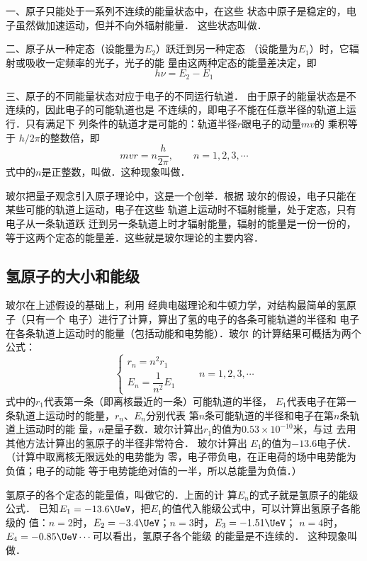 一、原子只能处于一系列不连续的能量状态中，在这些
状态中原子是稳定的，电子虽然做加速运动，但并不向外辐射能量．
这些状态叫做．

二、原子从一种定态（设能量为$E_2$）跃迁到另一种定态
（设能量为$E_1$）时，它辐射或吸收一定频率的光子，光子的能
量由这两种定态的能量差决定，即
\[h\nu=E_2-E_1\]

三、原子的不同能量状态对应于电子的不同运行轨道．
由于原子的能量状态是不连续的，因此电子的可能轨道也是
不连续的，即电子不能在任意半径的轨道上运行．只有满足下
列条件的轨道才是可能的：轨道半径$r$跟电子的动量$mv$的
乘积等于 $h/2\pi$的整数倍，即
\[mvr=n\frac{h}{2\pi},\qquad n=1,2,3,\cdots\]
式中的$n$是正整数，叫做．这种现象叫做．

玻尔把量子观念引入原子理论中，这是一个创举．根据
玻尔的假设，电子只能在某些可能的轨道上运动，电子在这些
轨道上运动时不辐射能量，处于定态，只有电子从一条轨道跃
迁到另一条轨道上时才辐射能量，辐射的能量是一份一份的，
等于这两个定态的能量差．这些就是玻尔理论的主要内容．

\subsection{氢原子的大小和能级}

玻尔在上述假设的基础上，利用
经典电磁理论和牛顿力学，对结构最简单的氢原子（只有一个
电子）进行了计算，算出了氢的电子的各条可能轨道的半径和
电子在各条轨道上运动时的能量（包括动能和电势能）．玻尔
的计算结果可概括为两个公式：
\[\begin{cases}
    r_n=n^2 r_1\\
    E_n=\dfrac{1}{n^2}E_1
\end{cases}\qquad n=1,2,3,\cdots\]
式中的$r_1$代表第一条（即离核最近的一条）可能轨道的半径，
$E_1$代表电子在第一条轨道上运动时的能量，$r_n$、$E_n$分别代表
第$n$条可能轨道的半径和电子在第$n$条轨道上运动时的能
量，$n$是量子数．玻尔计算出$r_1$的值为$0.53\times10^{-10}$米，与过
去用其他方法计算出的氢原子的半径非常符合．
玻尔计算出
$E_1$的值为$-13.6$电子伏．（计算中取离核无限远处的电势能为
零，电子带负电，在正电荷的场中电势能为负值；电子的动能
等于电势能绝对值的一半，所以总能量为负值．）

氢原子的各个定态的能量值，叫做它的．上面的计
算$E_n$的式子就是氢原子的能级公式．
已知$E_1=-13.6 \UeV $，把$E_1$的值代入能级公式中，可以计算出氢原子各能级的
值：$n=2$时，$E_2=-3.4 \UeV $；$n=3$时，$E_3=-1.51 \UeV $；
$n=4$时，$E_4=-0.85\UeV \cdots$可以看出，氢原子各个能级
的能量是不连续的．
这种现象叫做．

